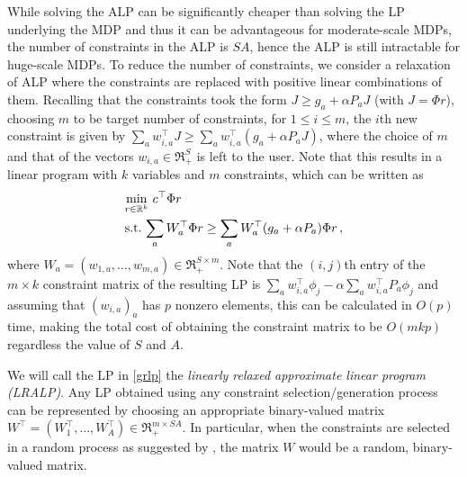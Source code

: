 \documentclass[12pt,draftcls,onecolumn]{IEEEtran}
\begin{document}
While solving the ALP can be significantly cheaper than solving the LP underlying the MDP
and thus it can be advantageous for moderate-scale MDPs,
 the number of constraints in the ALP is $SA$,
hence the ALP is still intractable for huge-scale MDPs.
To reduce the number of constraints, we consider a relaxation of ALP
where the constraints are replaced with positive linear
combinations of them.
Recalling that the constraints took the form $J \ge g_a + \alpha P_a J$ (with $J = \Phi r$),
choosing $m$ to be target number of constraints, for $1\le i \le m$, the $i$th new constraint is given by
$\sum_a w_{i,a}^\top J \ge \sum_a w_{i,a}^\top(g_a + \alpha P_a J)$,
where the choice of $m$ and that of the vectors $w_{i,a}\in \Re_+^S$ is left to the user.
Note that this results in a linear program with $k$ variables and $m$ constraints, which can be written as
\begin{align}\label{grlp}
\begin{split}
&\underset{r\in \Re^k}{\min}\, \, c^\top \Phi r\\
&\text{s.t.}\mb  \,\sum_a W_a^\top \Phi r\geq \sum_a W_a^\top (g_a + \alpha P_a) \Phi r\,,
\end{split}
\end{align}
where $W_a = (w_{1,a},\dots,w_{m,a}) \in \Re_+^{S \times m}$.
Note that the $(i,j)$th entry of the $m\times k$ constraint matrix of the resulting LP is
$\sum_a  w_{i,a}^\top  \phi_j - \alpha \sum_a w_{i,a}^\top P_a \phi_j$ and assuming that $(w_{i,a})_{a}$ has $p$ nonzero
elements, this can be calculated in $O( p )$ time, making the total cost of obtaining the constraint matrix to be $O(mkp)$ regardless the value of $S$ and $A$. 

We will call the LP in \eqref{grlp} the \emph{linearly relaxed approximate linear program (LRALP)}.
Any LP obtained using
any constraint selection/generation process can be represented by choosing an appropriate binary-valued matrix
$W^\top = (W_1^\top,\dots,W_A^\top)\in \Re_+^{m\times SA}$. In particular, when the constraints are selected
in a random process as suggested by \citet{CS}, the matrix $W$ would be a random, binary-valued matrix.
\end{document}
